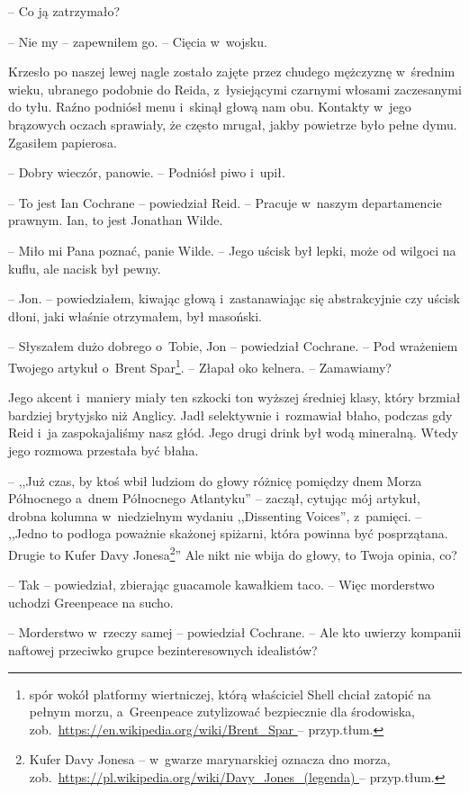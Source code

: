 \documentclass[oneside,polish,11pt,sfheadings]{mwbk}
\begin{document}
-- Co ją zatrzymało?

-- Nie my -- zapewniłem go. -- Cięcia w~wojsku.

Krzesło po naszej lewej nagle zostało zajęte przez chudego mężczyznę w~średnim wieku, ubranego podobnie do Reida, z~łysiejącymi czarnymi
włosami zaczesanymi do tyłu. Raźno podniósł menu i~skinął głową nam obu.
Kontakty w~jego brązowych oczach sprawiały, że często mrugał, jakby
powietrze było pełne dymu. Zgasiłem papierosa.

-- Dobry wieczór, panowie. -- Podniósł piwo i~upił.

-- To jest Ian Cochrane -- powiedział Reid. -- Pracuje w~naszym
departamencie prawnym. Ian, to jest Jonathan Wilde.

-- Miło mi Pana poznać, panie Wilde. -- Jego uścisk był lepki, może od
wilgoci na kuflu, ale nacisk był pewny.

-- Jon. -- powiedziałem, kiwając głową i~zastanawiając się abstrakcyjnie
czy uścisk dłoni, jaki właśnie otrzymałem, był masoński.

-- Słyszałem dużo dobrego o~Tobie, Jon -- powiedział Cochrane. -- Pod
wrażeniem Twojego artykuł o~Brent Spar\footnote{spór
wokół platformy wiertniczej, którą właściciel Shell chciał zatopić na
pełnym morzu, a~Greenpeace zutylizować bezpiecznie dla środowiska,
zob.~\url{https://en.wikipedia.org/wiki/Brent_Spar } -- przyp.tłum.}. -- Złapał oko kelnera. -- Zamawiamy?

Jego akcent i~maniery miały ten szkocki ton wyższej średniej klasy,
który brzmiał bardziej brytyjsko niż Anglicy. Jadł selektywnie i~rozmawiał błaho, podczas gdy Reid i~ja zaspokajaliśmy nasz głód. Jego
drugi drink był wodą mineralną. Wtedy jego rozmowa przestała być błaha.

-- ,,Już czas, by ktoś wbił ludziom do głowy różnicę pomiędzy dnem Morza
Północnego a~dnem Północnego Atlantyku'' -- zaczął, cytując mój artykuł,
drobna kolumna w~niedzielnym wydaniu ,,Dissenting Voices'', z~pamięci. -- ,,Jedno to podłoga poważnie skażonej spiżarni, która powinna być
posprzątana. Drugie to Kufer Davy Jonesa\footnote{Kufer Davy Jonesa -- w~gwarze marynarskiej oznacza dno morza,
zob.~\url{https://pl.wikipedia.org/wiki/Davy_Jones_(legenda)
} -- przyp.tłum.}'' Ale nikt nie wbija do głowy,
to Twoja opinia, co? 

-- Tak -- powiedział, zbierając guacamole kawałkiem taco. -- Więc
morderstwo uchodzi Greenpeace na sucho.

-- Morderstwo w~rzeczy samej -- powiedział Cochrane. -- Ale kto uwierzy
kompanii naftowej przeciwko grupce bezinteresownych idealistów?
\end{document}
